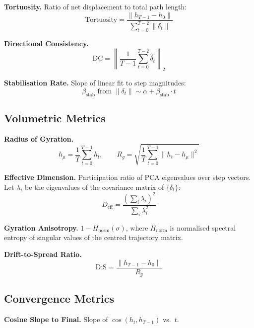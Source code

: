 \documentclass[11pt,twocolumn]{article}
\begin{document}
\textbf{Tortuosity.} Ratio of net displacement to total path length:
\begin{equation}
\text{Tortuosity} = \frac{\|h_{T-1} - h_0\|}{\sum_{t=0}^{T-2} \|\delta_t\|}
\end{equation}

\textbf{Directional Consistency.}
\begin{equation}
\text{DC} = \left\|\frac{1}{T-1} \sum_{t=0}^{T-2} \hat{\delta}_t\right\|_2
\end{equation}

\textbf{Stabilisation Rate.} Slope of linear fit to step magnitudes:
\begin{equation}
\beta_{\text{stab}} \text{ from } \|\delta_t\| \sim \alpha + \beta_{\text{stab}} \cdot t
\end{equation}

\subsection{Volumetric Metrics}

\textbf{Radius of Gyration.}
\begin{equation}
h_\mu = \frac{1}{T}\sum_{t=0}^{T-1} h_t, \qquad R_g = \sqrt{\frac{1}{T}\sum_{t=0}^{T-1}\|h_t - h_\mu\|^2}
\label{eq:rg}
\end{equation}

\textbf{Effective Dimension.} Participation ratio of PCA eigenvalues over step vectors. Let $\lambda_i$ be the eigenvalues of the covariance matrix of $\{\delta_t\}$:
\begin{equation}
D_{\text{eff}} = \frac{\left(\sum_i \lambda_i\right)^2}{\sum_i \lambda_i^2}
\label{eq:deff}
\end{equation}

\textbf{Gyration Anisotropy.} $1 - H_{\text{norm}}(\sigma)$, where $H_{\text{norm}}$ is normalised spectral entropy of singular values of the centred trajectory matrix.

\textbf{Drift-to-Spread Ratio.}
\begin{equation}
\text{D:S} = \frac{\|h_{T-1} - h_0\|}{R_g}
\end{equation}

\subsection{Convergence Metrics}

\textbf{Cosine Slope to Final.} Slope of $\cos(h_t, h_{T-1})$ vs.\ $t$.
\end{document}

